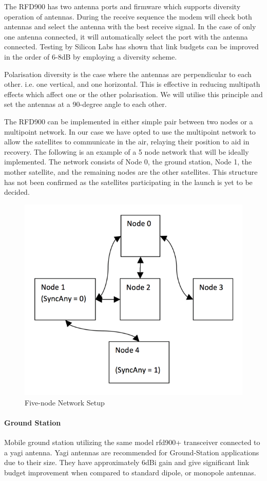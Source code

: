 The RFD900 has two antenna ports and firmware which supports diversity operation of antennas. During the receive sequence the modem will check both antennas and select the antenna with the best receive signal. In the case of only one antenna connected, it will automatically select the port with the antenna connected. Testing by Silicon Labs has shown that link budgets can be improved in the order of 6-8dB by employing a diversity scheme.

\noindent 
Polarisation diversity is the case where the antennas are perpendicular to each other. i.e. one vertical, and one horizontal. This is effective in reducing multipath effects which affect one or the other polarisation. We will utilise this principle and set the antennas at a 90-degree angle to each other.

\noindent
The RFD900 can be implemented in either simple pair between two nodes or a multipoint network. In our case we have opted to use the multipoint network to allow the satellites to communicate in the air, relaying their position to aid in recovery. The following is an example of a 5 node network that will be ideally implemented. The network consists of Node 0, the ground station, Node 1, the mother satellite, and the remaining nodes are the other satellites. This structure has not been confirmed as the satellites participating in the launch is yet to be decided.
\begin{figure}[H]
    \centering
    \includegraphics[width=0.7\linewidth]{./figures/nodes}
    \caption{Five-node Network Setup}
\end{figure}

\paragraph{Ground Station}
Mobile ground station utilizing the same model rfd900+ transceiver connected to a yagi antenna. Yagi antennas are recommended for Ground-Station applications due to their size. They have approximately 6dBi gain and give significant link budget improvement when compared to standard dipole, or monopole antennas. 

